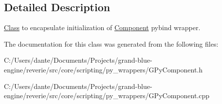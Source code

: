 \subsection{Detailed Description}
\mbox{\hyperlink{struct_class}{Class}} to encapsulate initialization of \mbox{\hyperlink{classrev_1_1_component}{Component}} pybind wrapper. 

The documentation for this class was generated from the following files\+:\begin{DoxyCompactItemize}
\item 
C\+:/\+Users/dante/\+Documents/\+Projects/grand-\/blue-\/engine/reverie/src/core/scripting/py\+\_\+wrappers/G\+Py\+Component.\+h\item 
C\+:/\+Users/dante/\+Documents/\+Projects/grand-\/blue-\/engine/reverie/src/core/scripting/py\+\_\+wrappers/G\+Py\+Component.\+cpp\end{DoxyCompactItemize}
